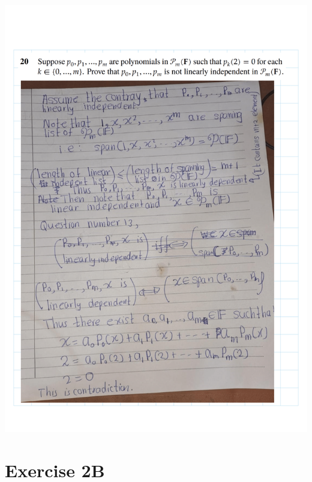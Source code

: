 \documentclass[
]{book}
\theoremstyle{definition}
\theoremstyle{definition}
\theoremstyle{definition}
\theoremstyle{definition}
\theoremstyle{remark}
\begin{document}
\includegraphics{fig/Ex2A/Ex2A-26.png}

\section{Exercise 2B}\label{exercise-2b}

  
\end{document}
